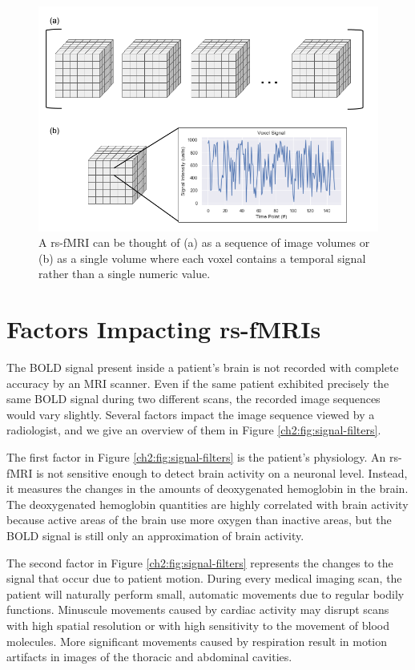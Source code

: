 \begin{figure}
\centering
\includegraphics[width=1.0\textwidth]{2/rsfMRI-views.png}
\caption{A rs-fMRI can be thought of (a) as a sequence of image volumes or (b) as a single volume where each voxel contains a temporal signal rather than a single numeric value.}
\label{ch2:fig:rsfmri-views}
\end{figure}

\clearpage

\section{Factors Impacting rs-fMRIs}

The BOLD signal present inside a patient's brain is not recorded with complete accuracy by an MRI scanner. Even if the same patient exhibited precisely the same BOLD signal during two different scans, the recorded image sequences would vary slightly. Several factors impact the image sequence viewed by a radiologist, and we give an overview of them in Figure \ref{ch2:fig:signal-filters}. 

The first factor in Figure \ref{ch2:fig:signal-filters} is the patient's physiology. An rs-fMRI is not sensitive enough to detect brain activity on a neuronal level. Instead, it measures the changes in the amounts of deoxygenated hemoglobin in the brain. The deoxygenated hemoglobin quantities are highly correlated with brain activity because active areas of the brain use more oxygen than inactive areas, but the BOLD signal is still only an approximation of brain activity.

The second factor in Figure \ref{ch2:fig:signal-filters} represents the changes to the signal that occur due to patient motion.
During every medical imaging scan, the patient will naturally perform small, automatic movements due to regular bodily functions. Minuscule movements caused by cardiac activity may disrupt scans with high spatial resolution or with high sensitivity to the movement of blood molecules. More significant movements caused by respiration result in motion artifacts in images of the thoracic and abdominal cavities. 

